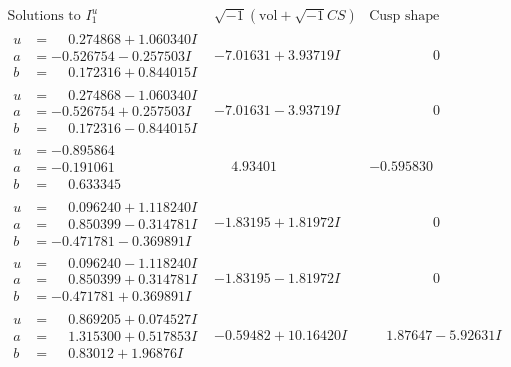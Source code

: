 \documentclass[1p]{elsarticle_modified}
\theoremstyle{definition}
\newcommand{\I}{\sqrt{-1}}
\begin{document}
$$\begin{array}{c|c|c}  
\text{Solutions to }I^u_{1}& \I (\text{vol} + \sqrt{-1}CS) & \text{Cusp shape}\\
 \hline 
\begin{aligned}
u &= \phantom{-}0.274868 + 1.060340 I \\
a &= -0.526754 - 0.257503 I \\
b &= \phantom{-}0.172316 + 0.844015 I\end{aligned}
 & -7.01631 + 3.93719 I & \phantom{-0.000000 } 0 \\ \hline\begin{aligned}
u &= \phantom{-}0.274868 - 1.060340 I \\
a &= -0.526754 + 0.257503 I \\
b &= \phantom{-}0.172316 - 0.844015 I\end{aligned}
 & -7.01631 - 3.93719 I & \phantom{-0.000000 } 0 \\ \hline\begin{aligned}
u &= -0.895864\phantom{ +0.000000I} \\
a &= -0.191061\phantom{ +0.000000I} \\
b &= \phantom{-}0.633345\phantom{ +0.000000I}\end{aligned}
 & \phantom{-}4.93401\phantom{ +0.000000I} & -0.595830\phantom{ +0.000000I} \\ \hline\begin{aligned}
u &= \phantom{-}0.096240 + 1.118240 I \\
a &= \phantom{-}0.850399 - 0.314781 I \\
b &= -0.471781 - 0.369891 I\end{aligned}
 & -1.83195 + 1.81972 I & \phantom{-0.000000 } 0 \\ \hline\begin{aligned}
u &= \phantom{-}0.096240 - 1.118240 I \\
a &= \phantom{-}0.850399 + 0.314781 I \\
b &= -0.471781 + 0.369891 I\end{aligned}
 & -1.83195 - 1.81972 I & \phantom{-0.000000 } 0 \\ \hline\begin{aligned}
u &= \phantom{-}0.869205 + 0.074527 I \\
a &= \phantom{-}1.315300 + 0.517853 I \\
b &= \phantom{-}0.83012 + 1.96876 I\end{aligned}
 & -0.59482 + 10.16420 I & \phantom{-}1.87647 - 5.92631 I \\ \hline\begin{aligned}

\end{aligned}
\end{array}$$
\end{document}
